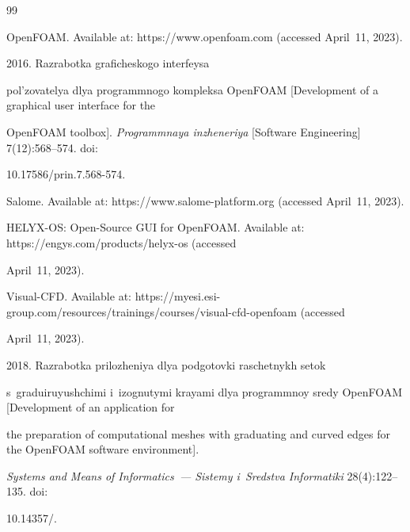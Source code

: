 {\small\frenchspacing


{ %




\begin{thebibliography}{99}




OpenFOAM. Available at: {\sf https://www.openfoam.com} (accessed April~11, 2023).




 2016. Razrabotka gra\-fi\-che\-sko\-go interfeysa 


pol'zovatelya dlya programmnogo kompleksa OpenFOAM [Development of a graphical user interface for the 


OpenFOAM toolbox]. \textit{Programmnaya inzheneriya} [Software Engineering] 7(12):568--574. doi: 


10.17586\!/\!prin.7.568-574.




Salome. Available at: {\sf https://www.salome-platform.org} (accessed April~11, 2023).




HELYX-OS: Open-Source GUI for OpenFOAM. Available at: {\sf https://engys.com/\linebreak products/helyx-os} (accessed 


April~11, 2023).




Visual-CFD. Available at: {\sf https://myesi.esi-group.com/resources/trainings/courses/\linebreak visual-cfd-openfoam} (accessed 


April~11, 2023).




 2018. Razrabotka prilozheniya dlya podgotovki raschetnykh setok 


s~graduiruyushchimi i~izognutymi krayami dlya programmnoy sredy OpenFOAM [Development of an application for 


the preparation of computational meshes with graduating and curved edges for the OpenFOAM software environment]. 


\textit{Systems and Means of Informatics~--- Sistemy i~Sredstva Informatiki} 28(4):122--135. doi: 


10.14357\!/.



\end{thebibliography}}}
